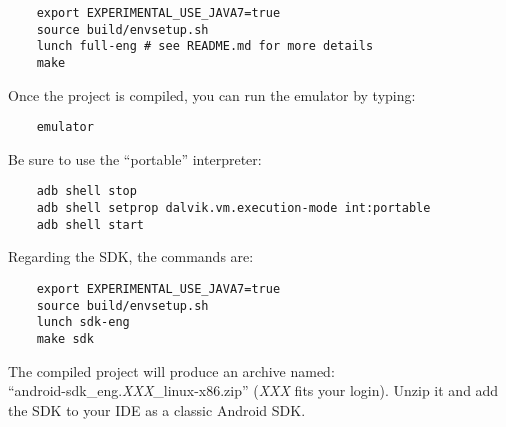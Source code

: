 \documentclass{sig-alternate}
\begin{document}
  {\scriptsize \begin{verbatim}
    export EXPERIMENTAL_USE_JAVA7=true
    source build/envsetup.sh
    lunch full-eng # see README.md for more details
    make
  \end{verbatim}}\vspace{-.8em}

  Once the project is compiled, you can run the emulator by typing:

  {\scriptsize \begin{verbatim}
    emulator
  \end{verbatim}}\vspace{-.8em}

  Be sure to use the ``portable'' interpreter:

  {\scriptsize \begin{verbatim}
    adb shell stop
    adb shell setprop dalvik.vm.execution-mode int:portable
    adb shell start
  \end{verbatim}}\vspace{-.8em}

  Regarding the SDK, the commands are:

  {\scriptsize \begin{verbatim}
    export EXPERIMENTAL_USE_JAVA7=true
    source build/envsetup.sh
    lunch sdk-eng
    make sdk
  \end{verbatim}}\vspace{-.8em}

  The compiled project will produce an archive named:\\
  ``android-sdk\_eng.{\it XXX}\_linux-x86.zip''
  ({\it XXX} fits your login).
  Unzip it and add the SDK to your IDE as a classic Android SDK.
\end{document}
